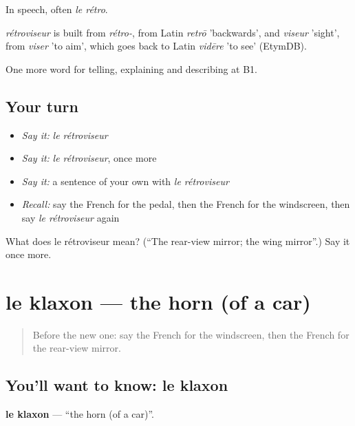 In speech, often \emph{le rétro}.

\begin{cousinweb}
\emph{rétroviseur} is built from \emph{rétro-}, from Latin \emph{retrō} 'backwards', and \emph{viseur} 'sight', from \emph{viser} 'to aim', which goes back to Latin \emph{vidēre} 'to see' (EtymDB).
\end{cousinweb}

\begin{grammarlens}[title={What you've built}]
One more word for telling, explaining and describing at B1.
\end{grammarlens}

\subsection*{Your turn}
\begin{itemize}
\raggedright
  \item \emph{Say it:} \emph{le rétroviseur}
  \item \emph{Say it:} \emph{le rétroviseur}, once more
  \item \emph{Say it:} a sentence of your own with \emph{le rétroviseur}
  \item \emph{Recall:} say the French for the pedal, then the French for the windscreen, then say \emph{le rétroviseur} again
\end{itemize}

\begin{tcolorbox}[breakable,colback=teal!4,colframe=teal!35!black,title={Before you move on}]
What does le rétroviseur mean? (\textquotedblleft{}The rear-view mirror; the wing mirror\textquotedblright{}.) Say it once more.
\end{tcolorbox}
\section[le klaxon]{le klaxon — the horn (of a car)}

\label{lesson:FR-C402-klaxon}



\begin{quote}
Before the new one: say the French for the windscreen, then the French for the rear-view mirror.
\end{quote}

\subsection*{You'll want to know: le klaxon}
\textbf{le klaxon} — \textquotedblleft{}the horn (of a car)\textquotedblright{}.

